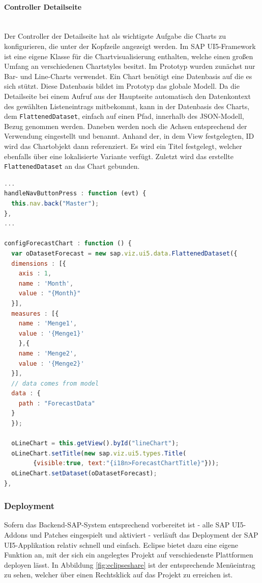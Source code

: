 \paragraph{Controller Detailseite}$\;$ \\
Der Controller der Detailseite hat als wichtigste Aufgabe die Charts zu konfigurieren, die unter der Kopfzeile angezeigt werden. Im SAP UI5-Framework ist eine eigene Klasse für die Chartvisualisierung enthalten, welche einen großen Umfang an verschiedenen Chartstyles besitzt. Im Prototyp wurden zunächst nur Bar- und Line-Charts verwendet. Ein Chart benötigt eine Datenbasis auf die es sich stützt. Diese Datenbasis bildet im Prototyp das globale Modell. Da die Detailseite bei einem Aufruf aus der Hauptseite automatisch den Datenkontext des gewählten Listeneintrags mitbekommt, kann in der Datenbasis des Charts, dem \texttt{FlattenedDataset}, einfach auf einen Pfad, innerhalb des JSON-Modell, Bezug genommen werden. Daneben werden noch die Achsen entsprechend der Verwendung eingestellt und benannt. Anhand der, in dem View festgelegten, ID wird das Chartobjekt dann referenziert. Es wird ein Titel festgelegt, welcher ebenfalls über eine lokalisierte Variante verfügt. Zuletzt wird das erstellte \texttt{FlattenedDataset} an das Chart gebunden.

\vspace{1em}
\begin{lstlisting}[language=JavaScript, caption=Chart Konfigurierung, label=lst:chartconfig]
...
handleNavButtonPress : function (evt) {
  this.nav.back("Master");
},
...
	
configForecastChart : function () {
  var oDatasetForecast = new sap.viz.ui5.data.FlattenedDataset({
  dimensions : [{
    axis : 1,
    name : 'Month',
    value : "{Month}"
  }],
  measures : [{
    name : 'Menge1',
    value : '{Menge1}'
    },{
    name : 'Menge2',
    value : '{Menge2}'
  }],		
  // data comes from model
  data : {
    path : "ForecastData"
  }
  });

  oLineChart = this.getView().byId("lineChart");
  oLineChart.setTitle(new sap.viz.ui5.types.Title(
        {visible:true, text:"{i18n>ForecastChartTitle}"}));
  oLineChart.setDataset(oDatasetForecast);
},
\end{lstlisting}

\subsubsection{Deployment}
Sofern das Backend-SAP-System entsprechend vorbereitet ist - alle SAP UI5-Addons und Patches eingespielt und aktiviert - verläuft das Deployment der SAP UI5-Applikation relativ schnell und einfach. Eclipse bietet dazu eine eigene Funktion an, mit der sich ein angelegtes Projekt auf verschiedenste Plattformen deployen lässt. In Abbildung \ref{fig:eclipseshare} ist der entsprechende Menüeintrag zu sehen, welcher über einen Rechtsklick auf das Projekt zu erreichen ist.

